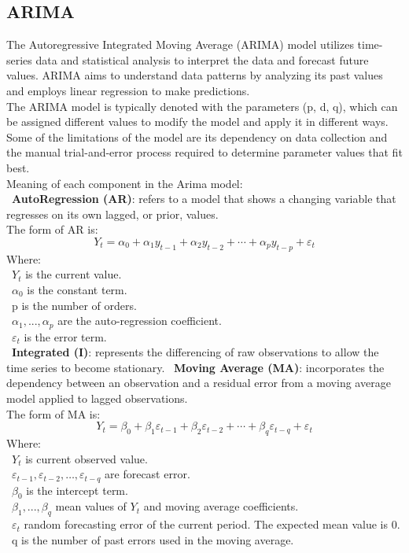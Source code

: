 \documentclass{ieeeojies}
\begin{document}
	\subsection{ARIMA}
	The Autoregressive Integrated Moving Average (ARIMA) \cite{b8} model utilizes time-series data and statistical analysis to interpret the data and forecast future values. ARIMA aims to understand data patterns by analyzing its past values and employs linear regression to make predictions. \cite{b8}\\
	The ARIMA model is typically denoted with the parameters (p, d, q), which can be assigned different values to modify the model and apply it in different ways.\\
	Some of the limitations of the model are its dependency on data collection and the manual trial-and-error process required to determine parameter values that fit best. \\
	Meaning of each component in the Arima model:\\
	\indent \textbullet\ \textbf{AutoRegression (AR)}: refers to a model that shows a changing variable that regresses on its own lagged, or prior, values.\\
	The form of AR is: 
	\[Y_t=\alpha_0+\alpha_1 y_{t-1}+\alpha_2 y_{t-2}+\cdots+\alpha_p y_{t-p}+\varepsilon_t\]
	Where:\\
	\indent\textbullet\ \(Y_t\) is the current value.\\
	\indent\textbullet\ \(\alpha_0\) is the constant term.\\
	\indent\textbullet\ p is the number of orders.\\
	\indent\textbullet\ \(\alpha_1,..., \alpha_p\) are the auto-regression coefficient.\\
	\indent\textbullet\ \(\varepsilon_t\) is the error term.\\
	
	\indent \textbullet\ \textbf{Integrated (I)}: represents the differencing of raw observations to allow the time series to become stationary.
	\indent \textbullet\ \textbf{Moving Average (MA)}: incorporates the dependency between an observation and a residual error from a moving average model applied to lagged observations.\\
	The form of MA is:
	\[Y_t=\beta_0+\beta_1 \varepsilon_{t-1}+\beta_2 \varepsilon_{t-2}+\cdots+\beta_q \varepsilon_{t-q}+\varepsilon_t\]
	Where:\\
	\indent\textbullet\ \(Y_t\) is current observed value.\\
	\indent\textbullet\ \(\varepsilon_{t-1}, \varepsilon_{t-2}, \ldots, \varepsilon_{t-q}\) are forecast error.\\
	\indent\textbullet\ \(\beta_0\) is the intercept term.\\
	\indent\textbullet\ \(\beta_1,..., \beta_q\) mean values of \(Y_t\) and moving average coefficients.\\
	\indent\textbullet\ \(\varepsilon_{t}\) random forecasting error of the current period. The expected mean value is 0.\\
	\indent\textbullet\ q is the number of past errors used in the moving average.
	
\end{document}

